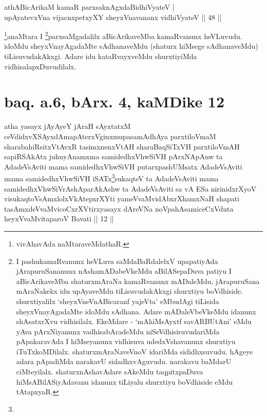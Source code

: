 
\begin{shl}
athA\s \s BicArikaM kamaR parxsaknAgxdaBidhiVyateV | \\
upAyatevxVna vijacnxpetxyXY sheyxVnavananx vidhiVyateV \hfill|| 48 || 
\end{shl}

\begin{artha}
\footnote[1]{vivAhavAda naMtaraveMdathaR.}anaMtara I \footnote[2]{I 
pashukamaRvanunx heVLuva saMdaBaRdalelxV upapatiyAda jArapuruSananunx 
nAshamADa\-beVkeMdu aBilASepaDuva patiyu I aBicArikaveMba shaturxmAraNa 
kamaRvanunx mADaleMdu, jArapuruSana mAraNakekx idu upAyaveMdu 
tiLisuvudakAkxgi shurxtiyu boVdhiside. shurxtiyalilx 
`sheyxVneVnABicaranf yajeVta' eMbudAgi tiLisida sheyxVnayAgadaMte 
idoMdu sAdhana. Adare mADaleVbeVkeMdu idanunx shAsatxrXvu vidhisilalx. 
EkeMdare - `mAhiMsAyxtf savARBUtAni' eMdu yAva pArxNiyanunx 
vadhisabAradeMdu niSeVdhisiruvudariMda pApakaravAda I hiMseyanunx 
vidhisuva udedxVshavanunx shurxtiyu iTuTxkoMDilalx. 
shaturxmAraNaveVnoV idariMda sididhxsuvudu. hAgeye adara pApadiMda 
narakavU sidadhxvAguvudu. narakavu baMdarU ciMteyilalx. 
shaturxnAshavAdare sAkeMdu taqpitxpaDuva hiMsABilASiyAdavanu idanunx 
tiLiyalu shurxtiyu boVdhiside eMdu tAtapxyaR.}parxsaMgadalilx aBicArikaveMba 
kamaRvanunx heVLuvudu. idoMdu sheyxVnayAgadaMte sAdhanaveMdu (shaturx 
hiMsege sAdhanaveMdu) tiLisuvudakAkxgi. Adare idu kataRvayxveMdu 
shurxtiyiMda vidhisalapxDuvudilalx.
\end{artha}

\section*{baq. a.6, bArx. 4, kaMDike 12}

\begin{shl}
atha yasayx jAyAyeY jAraH sAyxtatxM ceVdidxvXSAyxdAmapAterxV\s ginxmupasamAdhAya parxtiloVmaM sharabahiRsitxVtAvxR tasimxnenxVtAH sharaBaqSiTxVH parxtiloVmAH sapiRSAkAtx juhuyAnamxma samidedhxV\s hwSiVH pArxNApAnw ta AdadeV\s sAviti mama samidedhxV\s hwSiVH putarxpashUMsatx AdadeV\s sAviti mama samidedhxV\s hwSiVH \footnotemark[1]{}iSATx\footnote[2]{}sukaqteV ta AdadeV\s sAviti mama samidedhxV\s hwSiV\footnotemark[3]{}rAshA\footnotemark[4]{}parAkAshw ta AdadeV\s sAviti sa vA ESa nirinidxrXyoV visukaqtoV\s sAmxlolxVkAtepxrXYti yameVvaMvidAbxrXhamxNaH shapati tasAmxdeVvaMvicoCxrXVtirxyasayx dAreVNa noVpahAsamiceCxVduta heyxVvaMvitaparoV Bavati || 12 ||
\end{shl}

